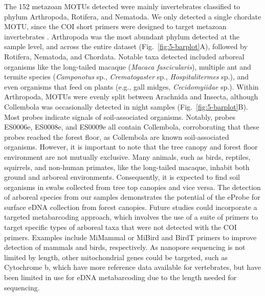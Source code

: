 The 152 metazoan \glspl{MOTU} detected were mainly invertebrates classified to phylum Arthropoda, Rotifera, and Nematoda. We only detected a single chordate \gls{MOTU}, since the COI short primers were designed to target metazoan invertebrates \cite{leray-2013,lobo-2013}. Arthropoda was the most abundant phylum detected at the sample level, and across the entire dataset (Fig.~\ref{fig:5-barplot}A), followed by Rotifera, Nematoda, and Chordata. Notable taxa detected included arboreal organisms like the long-tailed macaque (\textit{Macaca fascicularis}), multiple ant and termite species (\textit{Camponotus} sp., \textit{Crematogaster} sp., \textit{Hospitalitermes} sp.), and even organisms that feed on plants (e.g., gall midges, \textit{Cecidomyiidae} sp.). Within Arthropoda, \glspl{MOTU} were evenly split between Arachnida and Insecta, although Collembola was occasionally detected in night samples (Fig.~\ref{fig:5-barplot}B). %
Most probes indicate signals of soil-associated organisms. Notably, probes ES0006e, ES0008e, and ES0009e all contain Collembola, corroborating that these probes reached the forest floor, as Collembola are known soil-associated organisms. However, it is important to note that the tree canopy and forest floor environment are not mutually exclusive. Many animals, such as birds, reptiles, squirrels, and non-human primates, like the long-tailed macaque, inhabit both ground and arboreal environments. Consequently, it is expected to find soil organisms in swabs collected from tree top canopies and vice versa.
%
The detection of arboreal species from our samples demonstrates the potential of the eProbe for surface \gls{eDNA} collection from forest canopies. 
Future studies could incorporate a targeted metabarcoding approach, which involves the use of a suite of primers to target specific types of arboreal taxa that were not detected with the COI primers. Examples include MiMammal \cite{ushio-2017} or MiBird and BirdT \cite{ushio-2018, thalinger-2023} primers to improve detection of mammals and birds, respectively. As nanopore sequencing is not limited by length, other mitochondrial genes could be targeted, such as Cytochrome b, which have more reference data available for vertebrates, but have been limited in use for \gls{eDNA} metabarcoding due to the length needed for sequencing.


